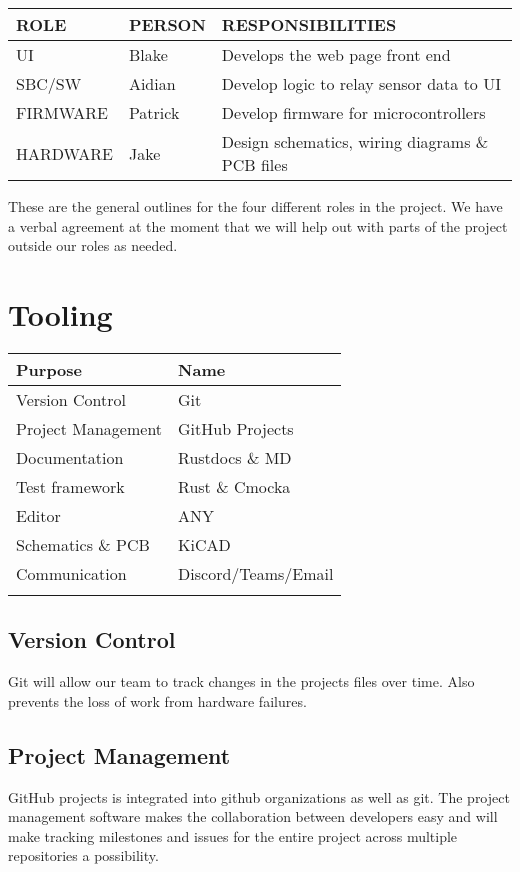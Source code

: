 \begin{longtable}[]{@{}lll@{}}
\toprule
ROLE & PERSON & RESPONSIBILITIES\tabularnewline
\midrule
\endhead
UI & Blake & Develops the web page front end\tabularnewline
SBC/SW & Aidian & Develop logic to relay sensor data to
UI\tabularnewline
FIRMWARE & Patrick & Develop firmware for
microcontrollers\tabularnewline
HARDWARE & Jake & Design schematics, wiring diagrams \& PCB
files\tabularnewline
\bottomrule
\end{longtable}

These are the general outlines for the four different roles in the
project. We have a verbal agreement at the moment that we will help out
with parts of the project outside our roles as needed.

\hypertarget{tooling}{%
\section{Tooling}\label{tooling}}

\begin{longtable}[]{@{}ll@{}}
\toprule
Purpose & Name\tabularnewline
\midrule
\endhead
Version Control & Git\tabularnewline
Project Management & GitHub Projects\tabularnewline
Documentation & Rustdocs \& MD\tabularnewline
Test framework & Rust \& Cmocka\tabularnewline
Editor & ANY\tabularnewline
Schematics \& PCB & KiCAD\tabularnewline
Communication & Discord/Teams/Email\tabularnewline
&\tabularnewline
\bottomrule
\end{longtable}

\hypertarget{version-control}{%
\subsection{Version Control}\label{version-control}}

Git will allow our team to track changes in the projects files over
time. Also prevents the loss of work from hardware failures.

\hypertarget{project-management}{%
\subsection{Project Management}\label{project-management}}

GitHub projects is integrated into github organizations as well as git.
The project management software makes the collaboration between
developers easy and will make tracking milestones and issues for the
entire project across multiple repositories a possibility.

